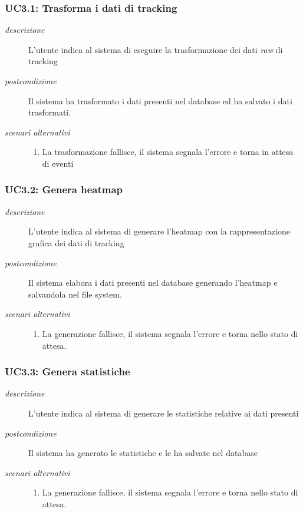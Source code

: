 \subsubsection{UC3.1: Trasforma i dati di tracking} \label{sec:uc3.1}
\begin{description}
 \item[\em{descrizione}] L'utente indica al sistema di eseguire la trasformazione dei dati \textit{raw} di tracking
  \item[\em{postcondizione}] Il sistema ha trasformato i dati presenti nel database ed ha salvato i dati trasformati.
  
  \item[\em{scenari alternativi}]  \mbox{}
    \begin{enumerate} 
  \item La trasformazione fallisce, il sistema segnala l'errore e torna in attesa di eventi
  \end{enumerate}  
  
  \end{description}
  
\subsubsection{UC3.2: Genera heatmap} \label{sec:uc3.2}
\begin{description}
 \item[\em{descrizione}] L'utente indica al sistema di generare l'heatmap con la rappresentazione grafica dei dati di tracking
  \item[\em{postcondizione}] Il sistema elabora i dati presenti nel database generando l'heatmap e salvandola nel file system.
  
\item[\em{scenari alternativi}] \mbox{}
  \begin{enumerate}
  \item La generazione fallisce, il sistema segnala l'errore e torna nello stato di attesa.
  \end{enumerate}  
  \end{description}
  
  
\subsubsection{UC3.3: Genera statistiche} \label{sec:uc3.3}
\begin{description}
 \item[\em{descrizione}] L'utente indica al sistema di generare le statistiche relative ai dati presenti
  \item[\em{postcondizione}] Il sistema ha generato le statistiche e le ha salvate nel database
  
\item[\em{scenari alternativi}] \mbox{}
  \begin{enumerate}
  \item La generazione fallisce, il sistema segnala l'errore e torna nello stato di attesa.
  \end{enumerate}  
  \end{description}  
  
